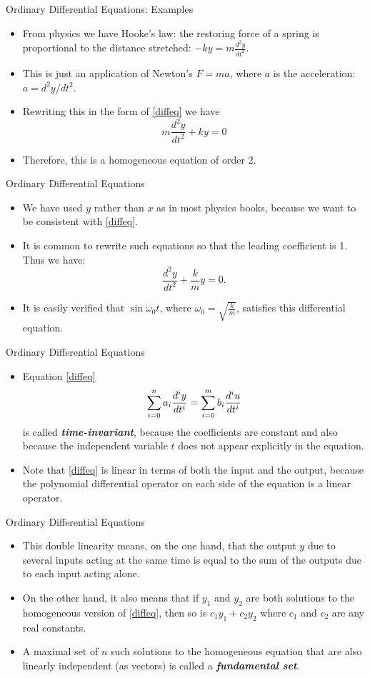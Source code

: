 \begin{frame}
Ordinary Differential Equations: Examples
 \begin{itemize}
 \item From physics we have Hooke's law: the restoring force of a
 spring is proportional to the distance stretched:  $-ky = m\frac{d^2y}{dt^2}$.
 \item This is just an application of Newton's $F=ma$, where $a$
 is the acceleration: $a=d^2y/dt^2$.
 \item Rewriting this in the form of \eqref{diffeq} we have
 \[m\frac{d^2y}{dt^2}+ky=0\]
 \item Therefore, this is a homogeneous equation of order 2.
\end{itemize}
\end{frame}
\begin{frame}
Ordinary Differential Equations
 \begin{itemize}
 \item We have used $y$ rather than $x$ as in most physics books,
 because we want to be consistent with \eqref{diffeq}.
 \item It is common to rewrite such equations so that the leading
 coefficient is 1.  Thus we have:
 \[\frac{d^2y}{dt^2}+\frac{k}{m}y=0.\]
 \item It is easily verified that $\sin\omega_0 t$, where
 $\omega_0=\sqrt{\frac{k}{m}}$, satisfies this differential equation.
\end{itemize}
\end{frame}
\begin{frame}
Ordinary Differential Equations
 \begin{itemize}
 \item Equation \eqref{diffeq}
 \[\sum_{i=0}^{n}a_i\frac{d^iy}{dt^i} = \sum_{i=0}^{m}b_i\frac{d^iu}{dt^i}\]
 is called
 \textit{\textbf{time-invariant}}, because the coefficients are
 constant and also because the independent variable $t$ does not
 appear explicitly in the equation.
 \item Note that \eqref{diffeq} is linear in terms of both the
 input and the output, because the polynomial differential
 operator on each side of the equation is a linear operator.
\end{itemize}
\end{frame}
\begin{frame}
Ordinary Differential Equations
 \begin{itemize}
 \item This double linearity means, on the one hand, that the output $y$ due to several inputs acting
 at the same time is equal to the sum of the outputs due to each
 input acting alone.
 \item On the other hand, it also means that if $y_1$ and $y_2$
 are both solutions to the homogeneous version of \eqref{diffeq},
 then so is $c_1y_1+c_2y_2$ where $c_1$ and $c_2$ are any real
 constants.
 \item A maximal set of $n$ such solutions to the homogeneous
 equation that are also linearly independent (as vectors) is
 called a \textit{\textbf{fundamental set}}.
\end{itemize}
\end{frame}
